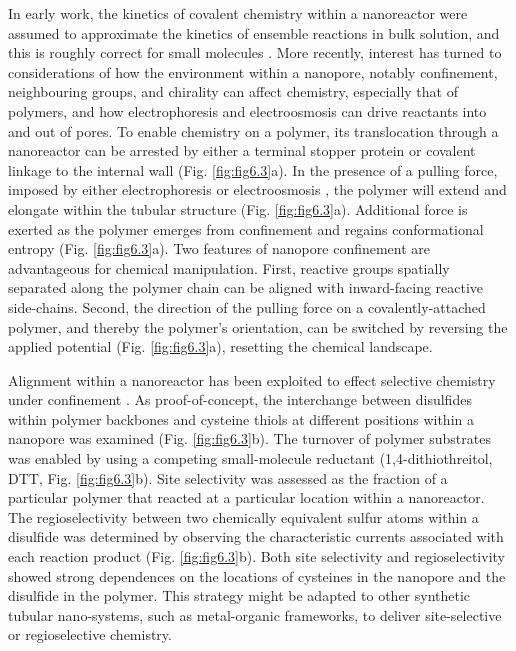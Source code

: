 In early work, the kinetics of covalent chemistry within a nanoreactor were assumed to approximate the kinetics of ensemble reactions in bulk solution, and this is roughly correct for small molecules \cite{Bayley2008a}. More recently, interest has turned to considerations of how the environment within a nanopore, notably confinement, neighbouring groups, and chirality can affect chemistry, especially that of polymers, and how electrophoresis and electroosmosis \cite{Gu2003} can drive reactants into and out of pores. To enable chemistry on a polymer, its translocation through a nanoreactor can be arrested by either a terminal stopper protein or covalent linkage to the internal wall (Fig. \ref{fig:fig6.3}a). In the presence of a pulling force, imposed by either electrophoresis or electroosmosis \cite{Gu2003}, the polymer will extend and elongate within the tubular structure (Fig. \ref{fig:fig6.3}a). Additional force is exerted as the polymer emerges from confinement and regains conformational entropy (Fig. \ref{fig:fig6.3}a). Two features of nanopore confinement are advantageous for chemical manipulation. First, reactive groups spatially separated along the polymer chain can be aligned with inward-facing reactive side-chains. Second, the direction of the pulling force on a covalently-attached polymer, and thereby the polymer's orientation, can be switched by reversing the applied potential (Fig. \ref{fig:fig6.3}a), resetting the chemical landscape.


Alignment within a nanoreactor has been exploited to effect selective chemistry under confinement \cite{Qing2019}. As proof-of-concept, the interchange between disulfides within polymer backbones and cysteine thiols at different positions within a nanopore was examined (Fig. \ref{fig:fig6.3}b). The turnover of polymer substrates was enabled by using a competing small-molecule reductant (1,4-dithiothreitol, DTT, Fig. \ref{fig:fig6.3}b). Site selectivity was assessed as the fraction of a particular polymer that reacted at a particular location within a nanoreactor. The regioselectivity between two chemically equivalent sulfur atoms within a disulfide was determined by observing the characteristic currents associated with each reaction product (Fig. \ref{fig:fig6.3}b). Both site selectivity and regioselectivity showed strong dependences on the locations of cysteines in the nanopore and the disulfide in the polymer. This strategy might be adapted to other synthetic tubular nano-systems, such as metal-organic frameworks, to deliver site-selective or regioselective chemistry.


